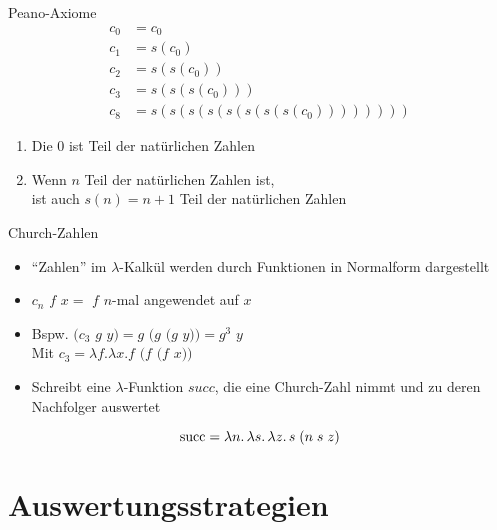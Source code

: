 \documentclass{beamer}
\begin{document}
\begin{frame}{Peano-Axiome}
	\begin{eqnarray*}
		c_0 &= c_0\\
		c_1 &= s (c_0)\\
		c_2 &= s (s (c_0))\\
		c_3 &= s (s (s (c_0)))\\
		c_8 &= s (s (s (s (s (s (s (s (c_0))))))))
	\end{eqnarray*}

	\begin{enumerate}
		\item Die 0 ist Teil der natürlichen Zahlen
		\item Wenn $n$ Teil der natürlichen Zahlen ist,\\
	 	      ist auch $s(n) = n + 1$ Teil der natürlichen Zahlen
	\end{enumerate}
\end{frame}

\begin{frame}{Church-Zahlen}
	\begin{itemize}
		\item \enquote{Zahlen} im $\lambda$-Kalkül werden durch Funktionen in Normalform dargestellt
		\item $c_n$ $f$ $x =$ $f$ $n$-mal angewendet auf $x$
		\item Bspw. $(c_3$ $g$ $y) = g$ $(g $ $(g$ $y)) = g^3$ $y$\\
		      Mit $c_3 = \lambda{}f.\lambda{}x.f$ $(f $ $(f$ $x))$
		\item Schreibt eine $\lambda$-Funktion $succ$, die eine Church-Zahl nimmt und zu deren Nachfolger auswertet
              \end{itemize}
              \pause

              \begin{equation*}
                \csucc = \lam{n}{\lam{s}{\lam{z}{
                  \app{s}{(
                    \app{n}{\app{s}{z}}
                  )}
                }}}
              \end{equation*}
\end{frame}

\section{Auswertungsstrategien}
\end{document}

